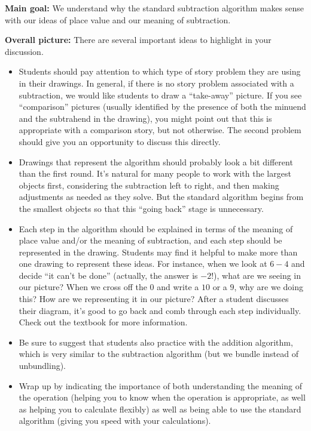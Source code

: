 \documentclass[nooutcomes,noauthor, handout]{ximera}
\begin{document}
\begin{instructorNotes} 



{\bf Main goal:} We understand why the standard subtraction algorithm makes sense with our ideas of place value and our meaning of subtraction.


{\bf Overall picture:} There are several important ideas to highlight in your discussion.

\begin{itemize}
	\item Students should pay attention to which type of story problem they are using in their drawings. In general, if there is no story problem associated with a subtraction, we would like students to draw a ``take-away'' picture. If you see ``comparison'' pictures (usually identified by the presence of both the minuend and the subtrahend in the drawing), you might point out that this is appropriate with a comparison story, but not otherwise. The second problem should give you an opportunity to discuss this directly.
	\item Drawings that represent the algorithm should probably look a bit different than the first round. It's natural for many people to work with the largest objects first, considering the subtraction left to right, and then making adjustments as needed as they solve. But the standard algorithm begins from the smallest objects so that this ``going back'' stage is unnecessary.
	\item Each step in the algorithm should be explained in terms of the meaning of place value and/or the meaning of subtraction, and each step should be represented in the drawing. Students may find it helpful to make more than one drawing to represent these ideas. For instance, when we look at $6-4$ and decide ``it can't be done'' (actually, the answer is $-2$!), what are we seeing in our picture? When we cross off the $0$ and write a $10$ or a $9$, why are we doing this? How are we representing it in our picture? After a student discusses their diagram, it's good to go back  and comb through each step individually. Check out the textbook for more information.
	\item Be sure to suggest that students also practice with the addition algorithm, which is very similar to the subtraction algorithm (but we bundle instead of unbundling).
	\item Wrap up by indicating the importance of both understanding the meaning of the operation (helping you to know when the operation is appropriate, as well as helping you to calculate flexibly) as well as being able to use the standard algorithm (giving you speed with your calculations). 
\end{itemize}


\end{instructorNotes}
\end{document}
